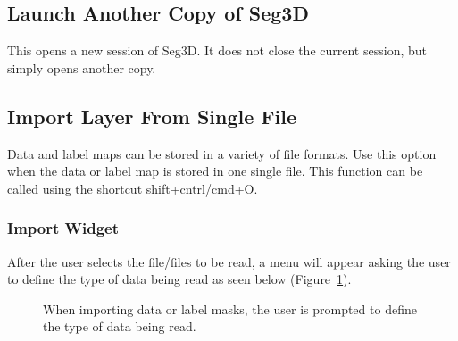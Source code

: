 \documentclass[fleqn,11pt,openany]{book}
\begin{document}
\subsection{Launch Another Copy of Seg3D}
This opens a new session of Seg3D.  It does not close the current session, but simply opens another copy.

\subsection{Import Layer From Single File}
\label{sec:importsinglefile}
Data and label maps can be stored in a variety of file formats.  Use this option when the data or label map is stored in one single file.  This function can be called using the shortcut shift+cntrl/cmd+O.

\subsubsection{Import Widget}
After the user selects the file/files to be read, a menu will appear asking the user to define the type of data being read as seen below (Figure~\ref{fig:ImportWidget}).

\begin{figure}[h!]
\caption{When importing data or label masks, the user is prompted to define the type of data being read.}\label{fig:ImportWidget}
\end{figure}
\end{document}
